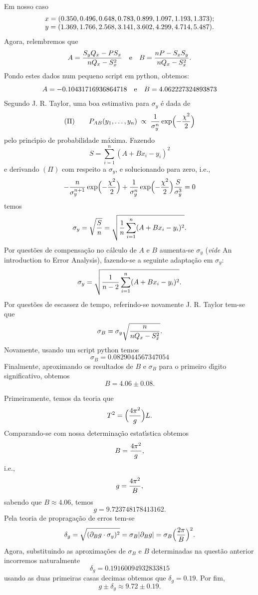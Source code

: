 Em nosso caso
$$
  \vbox{
    \halign{
      \hfil$#$\hfil\cr
      x=(0.350, 0.496, 0.648, 0.783, 0.899, 1.097, 1.193, 1.373);\cr
      y=(1.369, 1.766, 2.568, 3.141, 3.602, 4.299, 4.714, 5.487).\cr
    }
  }
$$
Agora, relembremos que
$$
  A={S_yQ_x-PS_x\over nQ_x-S_x^2}\quad\hbox{e}\quad B={nP-S_xS_y\over nQ_x-S_x^2}.
$$
Pondo estes dados num pequeno script em python, obtemos:
$$
  A=-0.10431716936864718\quad\hbox{e}\quad B=4.062227324893873
$$
Segundo J. R. Taylor, uma boa estimativa para $\sigma_y$ \'e dada de
$$
  (\Pi)\qquad P_{AB}(y_1,\ldots,y_n)\;\propto\;{1\over\sigma_y^n}\exp\Bigl(-{\chi^2\over2}\Bigr)
$$
pelo princ\'\i pio de probabilidade m\'axima. Fazendo
$$
  S=\sum_{i=1}^n(A+Bx_i-y_i)^2
$$
e derivando $(\Pi)$ com respeito a $\sigma_y$, e solucionando para zero, i.e.,
$$
  -{n\over\sigma_y^{n+1}}\exp\Bigl(-{\chi^2\over2}\Bigr)+{1\over\sigma_y^n}\exp\Bigl(-{\chi^2\over2}\Bigr){S\over\sigma_y^3}=0
$$
temos
$$
  \sigma_y=\sqrt{S\over n}=\sqrt{{1\over n}\sum_{i=1}^n(A+Bx_i-y_i)^2}.
$$
Por quest\~oes de compensa\c c\~ao no c\'alculo de $A$ e $B$ aumenta-se $\sigma_y$ ({\it vide} {\bsl An introduction to Error Analysis}\/), fazendo-se a seguinte adapta\c c\~ao em $\sigma_y$:
$$
  \sigma_y=\sqrt{{1\over n-2}\sum_{i=1}^n(A+Bx_i-y_i)^2}.
$$
Por quest\~oes de escassez de tempo, referindo-se novamente J. R. Taylor tem-se que
$$
  \sigma_B=\sigma_y\sqrt{n\over nQ_x-S_x^2}.
$$
Novamente, usando um script python temos
$$
  \sigma_B=0.0829044567347054
$$
Finalmente, aproximando os resultados de $B$ e $\sigma_B$ para o primeiro d\'\i gito significativo, obtemos
$$
  B=4.06\pm0.08.
$$


Primeiramente, temos da teoria que
$$
  T^2=\Bigl({4\pi^2\over g}\Bigr)L.
$$
Comparando-se com nossa determina\c c\~ao estat\'\i stica obtemos
$$
  B={4\pi^2\over g},
$$
i.e.,
$$
  g={4\pi^2\over B},
$$
sabendo que $B\approx4.06$, temos
$$
  g=9.723748178413162.
$$
Pela teoria de propraga\c c\~ao de erros tem-se
$$
  \delta_g=\sqrt{({\partial_Bg}\cdot\sigma_y)^2}=\sigma_B|\partial_Bg|=\sigma_B\Bigl({2\pi\over B}\Bigr)^2.
$$
Agora, substituindo as aproxima\c c\~oes de $\sigma_B$ e $B$ determinadas na quest\~ao anterior incorremos naturalmente
$$
  \delta_g=0.19160094932833815
$$
usando as duas primeiras casas decimas obtemos que $\delta_g=0.19$. Por fim,
$$
  g\pm\delta_g\approx9.72\pm0.19.
$$

